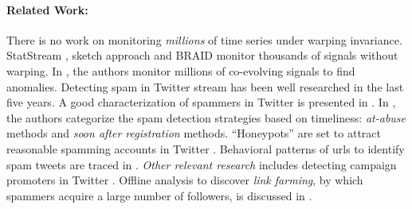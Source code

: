 






\paragraph{Related Work:}

There is no work on monitoring {\it millions} of time series under warping invariance. StatStream \cite{Zhu:02}, sketch approach \cite{Cole:05} and BRAID \cite{Sakurai:05} monitor thousands of signals without warping. In \cite{Matsubara2014}, the authors monitor millions of co-evolving signals to find anomalies. Detecting spam in Twitter stream has been well researched in the last five years. A good characterization of spammers in Twitter is presented in \cite{Grier2010}. In \cite{Thomas:13}, the authors categorize the spam detection strategies based on timeliness: \textit{at-abuse} methods and \textit{soon after registration} methods. ``Honeypots'' are set to attract reasonable spamming accounts in Twitter \cite{Stringhini2014,Lee2010}. Behavioral patterns of urls to identify spam tweets are traced in \cite{Cao2015}.
{\it Other relevant research} includes detecting campaign promoters in Twitter \cite{Li:14}. Offline analysis to discover \textit{link farming}, by which spammers acquire a large number of followers, is discussed in \cite{Ghosh2012}.

